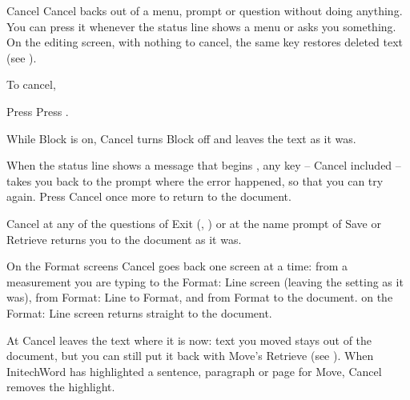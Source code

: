 \begin{Feature}{Cancel}
Cancel backs out of a menu, prompt or question without doing anything.  You
can press it whenever the status line shows a menu or asks you something.
On the editing screen, with nothing to cancel, the same key restores
deleted text (see ).

To cancel,
\begin{WPSteps}
\item Press 
\Or
Press .
\end{WPSteps}

\Notes
{}
While Block is on, Cancel turns Block off and leaves the text as it was.

When the status line shows a message that begins , any key --
Cancel included -- takes you back to the prompt where the error happened,
so that you can try again.  Press Cancel once more to return to the
document.

Cancel at any of the questions of Exit (,
) or at the name prompt of Save or Retrieve returns you to the
document as it was.

On the Format screens Cancel goes back one screen at a time: from a
measurement you are typing to the Format: Line screen (leaving the setting
as it was), from Format: Line to Format, and from Format to the document.
 on the Format: Line screen returns straight to the document.

At  Cancel leaves the text where
it is now: text you moved stays out of the document, but you can still put
it back with Move's Retrieve (see ).  When InitechWord
has highlighted a sentence, paragraph or page for Move, Cancel removes the
highlight.


\end{Feature}
